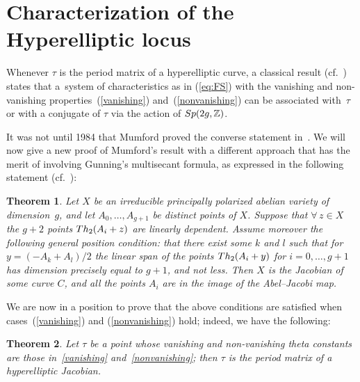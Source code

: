 \documentclass[11pt]{article}
\numberwithin{equation}{section}
\numberwithin{equation}{section}
\newtheorem{Theorem}{Theorem}[section]
\newcommand{\ZZ}{{\mathbb{Z}}}
\def\ZZ{{\mathbb Z}}
\begin{document}
\section{Characterization of the Hyperelliptic locus}
Whenever $\tau$ is the period matrix of a hyperelliptic curve, a classical result (cf.~\cite{Th}) states that a~system of characteristics as in (\ref{eq:FS}) with the vanishing and non-vanishing properties~(\ref{vanishing}) and~(\ref{nonvanishing}) can be associated with~$\tau$ or with a conjugate of $\tau$ via the action of ${\rm Sp}(2g, \ZZ)$.

 It was not until 1984 that Mumford proved the converse statement in~\cite{mu}. We will now give a new proof of Mumford's result with a different approach that has the merit of involving Gunning's multisecant formula, as expressed in the following statement (cf.~\cite{Gu}):
 \begin{Theorem} Let $X$ be an irreducible principally polarized abelian variety of dimension~$g$, and let $A_0, \dots , A_{g+1}$ be distinct points of $X$. Suppose that $\forall\, z\in X$ the $g + 2 $ points ${\rm Th}_2(A_i + z) $ are linearly dependent.
Assume moreover the following general position condition: that there
exist some $k$ and $l$ such that for $y=(-A_k+A_l)/2$ the linear span of the points ${\rm Th}_2(A_i + y) $ for $ i = 0 , \dots , g+1$ has dimension precisely equal to $g+1$, and
not less. Then $X$ is the Jacobian of some curve $C$, and all the points $A_i$ are in the image of the Abel--Jacobi map.
\end{Theorem}

We are now in a position to prove that the above conditions are satisfied when cases~(\ref{vanishing}) and (\ref{nonvanishing}) hold; indeed, we have the following:

\begin{Theorem} Let $\tau$ be a point whose vanishing and non-vanishing theta constants are those in~\eqref{vanishing} and~\eqref{nonvanishing}; then $\tau$ is the period
matrix of a hyperelliptic Jacobian.
\end{Theorem}
\end{document}

